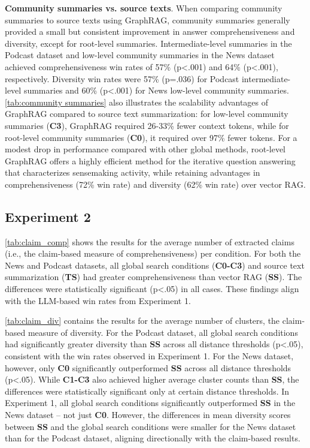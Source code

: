 \documentclass{article}
\begin{document}
\textbf{Community summaries vs. source texts}.  When comparing community summaries to source texts using GraphRAG, community summaries generally provided a small but consistent improvement in answer comprehensiveness and diversity, except for root-level summaries.
Intermediate-level summaries in the Podcast dataset and low-level community summaries in the News dataset achieved comprehensiveness win rates of 57\% (p\textless.001) and 64\% (p\textless.001), respectively.
Diversity win rates were 57\% (p=.036) for Podcast intermediate-level summaries and 60\% (p\textless.001) for News low-level community summaries.
\autoref{tab:community summaries} also illustrates the scalability advantages of GraphRAG compared to source text summarization: for low-level community summaries (\textbf{C3}), GraphRAG required 26-33\% fewer context tokens, while for root-level community summaries (\textbf{C0}), it required over 97\% fewer tokens. 
For a modest drop in performance compared with other global methods, root-level GraphRAG offers a highly efficient method for the iterative question answering that characterizes sensemaking activity, while retaining advantages in comprehensiveness (72\% win rate) and diversity (62\% win rate) over vector RAG.



\subsection{Experiment 2}

\autoref{tab:claim_comp} shows the results for the average number of extracted claims (i.e., the claim-based measure of comprehensiveness) per condition. For both the News and Podcast datasets, all global search conditions (\textbf{C0-C3}) and source text summarization (\textbf{TS}) had greater comprehensiveness than vector RAG (\textbf{SS}). The differences were statistically significant (p\textless.05) in all cases. These findings align with the LLM-based win rates from Experiment 1. 

\autoref{tab:claim_div} contains the results for the average number of clusters, the claim-based measure of diversity. For the Podcast dataset, all global search conditions had significantly greater diversity than \textbf{SS} across all distance thresholds (p\textless.05), consistent with the win rates observed in Experiment 1. For the News dataset, however, only \textbf{C0} significantly outperformed \textbf{SS} across all distance thresholds (p\textless.05). While \textbf{C1-C3} also achieved higher average cluster counts than \textbf{SS}, the differences were statistically significant only at certain distance thresholds. In Experiment 1, all global search conditions significantly outperformed \textbf{SS} in the News dataset – not just \textbf{C0}. However, the differences in mean diversity scores between \textbf{SS} and the global search conditions were smaller for the News dataset than for the Podcast dataset, aligning directionally with the claim-based results. 
\end{document}
